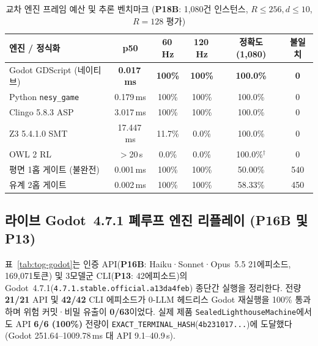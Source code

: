 \begin{table}[!tbp]
\caption{교차 엔진 프레임 예산 및 추론 벤치마크 (\textbf{P18B}: 1,080건 인스턴스, $R{\le}256, d{\le}10$, $R{=}128$ 평가)}
\label{tab:cross-engine}
\centering
\scriptsize
\setlength{\tabcolsep}{2.0pt}
\begin{tabularx}{\columnwidth}{@{}>{\raggedright\arraybackslash}Xccccc@{}}
\toprule
\textbf{엔진 / 정식화} & \textbf{p50} & \textbf{60\,Hz} & \textbf{120\,Hz} & \textbf{정확도 (1,080)} & \textbf{불일치} \\
\midrule
Godot GDScript (네이티브)              & \textbf{0.017\,ms} & \textbf{100\%} & \textbf{100\%} & \textbf{100.0\%} & \textbf{0} \\
Python \texttt{nesy\_game}             & 0.179\,ms & 100\% & 100\% & 100.0\% & 0 \\
Clingo 5.8.3 ASP~\cite{gebser2019clingo}  & 3.017\,ms & 100\% & 100\% & 100.0\% & 0 \\
Z3 5.4.1.0 SMT~\cite{demoura2008z3}       & 17.447\,ms & 11.7\% & 0.0\% & 100.0\% & 0 \\
OWL 2 RL~\cite{motik2012owl2profiles}     & $>$20\,s  & 0.0\% & 0.0\% & 100.0\%$^\dagger$ & 0 \\
\midrule
평면 1홉 게이트 (불완전)               & 0.001\,ms & 100\% & 100\% & 50.00\% & 540 \\
유계 2홉 게이트                        & 0.002\,ms & 100\% & 100\% & 58.33\% & 450 \\
\bottomrule
\end{tabularx}
\end{table}

\subsection{라이브 Godot~4.7.1 폐루프 엔진 리플레이 (\textbf{P16B} 및 \textbf{P13})}\label{sec:tog-godot}
표~\ref{tab:tog-godot}는 인증 API(\textbf{P16B}: Haiku·Sonnet·Opus~5.5 21에피소드, 169,071토큰) 및 3모델군 CLI(\textbf{P13}: 42에피소드)의 Godot~4.7.1(\texttt{4.7.1.\allowbreak stable.\allowbreak official.\allowbreak a13da4feb}) 종단간 실행을 정리한다. 전량 \textbf{21/21} API 및 \textbf{42/42} CLI 에피소드가 0-LLM 헤드리스 Godot 재실행을 100\% 통과하며 위험 커밋·비밀 유출이 \textbf{0/63}이었다. 실제 제품 \texttt{SealedLighthouseMachine}에서도 API \textbf{6/6 (100\%)} 전량이 \texttt{EXACT\_\allowbreak TERMINAL\_\allowbreak HASH}(\texttt{4b231017...})에 도달했다(Godot 251.64--1009.78\,ms 대 API 9.1--40.9\,s).

